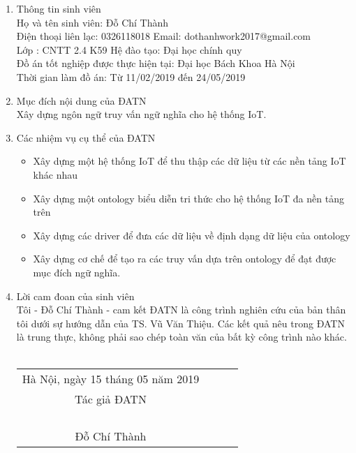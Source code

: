 \cleardoublepage

\begin{dedication}
  \begin{enumerate}
  	\item Thông tin sinh viên \\
  		Họ và tên sinh viên: Đỗ Chí Thành \\
		Điện thoại liên lạc: 0326118018        Email: dothanhwork2017@gmail.com\\
		Lớp : CNTT 2.4 K59            Hệ đào tạo: Đại học chính quy\\
		Đồ án tốt nghiệp được thực hiện tại: Đại học Bách Khoa Hà Nội\\
		Thời gian làm đồ án: Từ 11/02/2019 đến 24/05/2019
	\item Mục đích nội dung của ĐATN \\
		Xây dựng ngôn ngữ truy vấn ngữ nghĩa cho hệ thống IoT.
	\item Các nhiệm vụ cụ thể của ĐATN
		\begin{itemize}
			\item Xây dựng một hệ thống IoT để thu thập các dữ liệu từ các nền tảng IoT khác nhau
			\item Xây dựng một ontology biểu diễn tri thức cho hệ thống IoT đa nền tảng trên
			\item Xây dựng các driver để đưa các dữ liệu về định dạng dữ liệu của ontology
			\item Xây dựng cơ chế để tạo ra các truy vấn dựa trên ontology để đạt được mục đích ngữ nghĩa.
		\end{itemize}
	\item Lời cam đoan của sinh viên \\
		Tôi - Đỗ Chí Thành - cam kết ĐATN là công trình nghiên cứu của bản thân tôi dưới sự hướng dẫn của TS. Vũ Văn Thiệu. Các kết quả nêu trong ĐATN là trung thực, không phải sao chép toàn văn của bất kỳ công trình nào khác. \\
		\\
	  	\begin{tabu} {c c c c}
  	
  		 	\hspace{60mm} Hà Nội, ngày 15 tháng 05 năm 2019\\
  			\hspace{70mm} Tác giả ĐATN\\
  			\\
  			\\
  			\\
  			\\
  			\hspace{70mm} Đỗ Chí Thành\\
  	

\end{tabu}
\end{enumerate}
\end{dedication}

